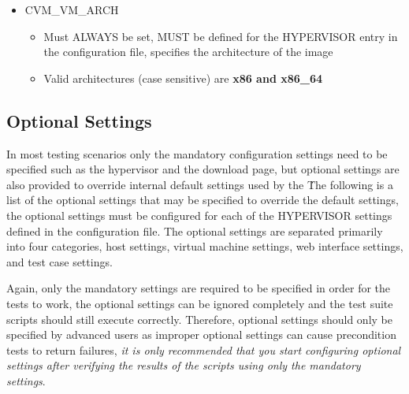 \begin{itemize}
\item	CVM\_VM\_ARCH
		\begin{itemize}
		\item	Must ALWAYS be set, MUST be defined for the HYPERVISOR entry in the configuration
				file, specifies the architecture of the \cernvm image
		\item	Valid architectures (case sensitive) are {\bf x86 and x86\_64}
		\end{itemize}


\end{itemize}




\subsection{Optional Settings}
\label{sct:optionalsettings}

In most testing scenarios only the mandatory configuration settings need to be specified such as the hypervisor and 
the download page, but optional settings are also provided to override internal default settings used by the 
\cernvmtestframework\. The following is a list of the optional settings that may be specified to override the default
settings, the optional settings must be configured for each of the HYPERVISOR settings defined in the configuration file.
The optional settings are separated primarily into four categories, host settings, virtual machine settings, web interface
settings, and test case settings. 

Again, only the mandatory settings are required to be specified in order for the tests to work, the optional settings 
can be ignored completely and the test suite scripts should still execute correctly. Therefore, optional settings should
only be specified by advanced users as improper optional settings can cause precondition tests to return failures,
\emph{it is only recommended that you start configuring optional settings after verifying the results of the scripts 
using only the mandatory settings}.



